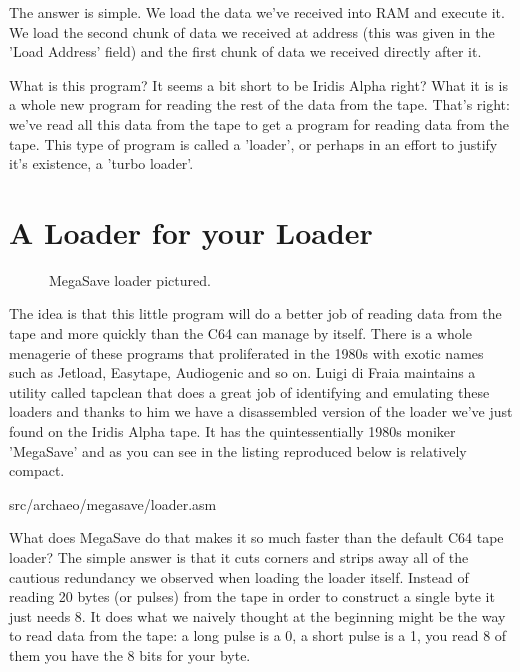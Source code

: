 The answer is simple. We load the data we've received into RAM and execute it. We load the second chunk of data
we received at address  (this was given in the 'Load Address' field) and the first chunk of data we received directly after it.

What is this program? It seems a bit short to be Iridis Alpha right? What it is is a whole new program for reading the
rest of the data from the tape. That's right: we've read all this data from the tape to get a program for reading data
from the tape. This type of program is called a 'loader', or perhaps in an effort to justify it's existence, a 'turbo loader'.

\section{A Loader for your Loader}
\begin{figure}[H]
  {
    \begin{adjustbox}{width=10cm,center}
    \end{adjustbox}
  }\caption[]{MegaSave loader pictured.}
\end{figure}

The idea is that this little program will do a better job of reading data from the tape and more quickly than the C64 can manage
by itself. There is a whole menagerie of these programs that proliferated in the 1980s with exotic names such as Jetload, Easytape,
Audiogenic and so on. Luigi di Fraia maintains a utility called tapclean that does a great job of identifying and emulating
these loaders and thanks to him we have a disassembled version of the loader we've just found on the Iridis Alpha tape. It has the
quintessentially 1980s moniker 'MegaSave' and as you can see in the listing reproduced below is relatively compact.


{src/archaeo/megasave/loader.asm}

What does MegaSave do that makes it so much faster than the default C64 tape loader? The simple answer is that it cuts corners
and strips away all of the cautious redundancy we observed when loading the loader itself. Instead of reading 20 bytes (or pulses)
from the tape in order to construct a single byte it just needs 8. It does what we naively thought at the beginning might be
the way to read data from the tape: a long pulse is a 0, a short pulse is a 1, you read 8 of them you have the 8 bits for your
byte.

